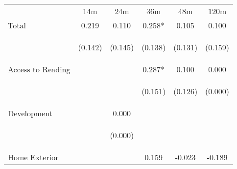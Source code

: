 \begin{tabular}{lccccc}
\hline \noalign{\smallskip} & 14m & 24m & 36m & 48m & 120m\\
\noalign{\smallskip}\hline \noalign{\smallskip}Total & 0.219 & 0.110 & 0.258* & 0.105 & 0.100\\
 & \begin{footnotesize}(0.142)\end{footnotesize} & \begin{footnotesize}(0.145)\end{footnotesize} & \begin{footnotesize}(0.138)\end{footnotesize} & \begin{footnotesize}(0.131)\end{footnotesize} & \begin{footnotesize}(0.159)\end{footnotesize}\\
\noalign{\smallskip}Access to Reading &  &  & 0.287* & 0.100 & 0.000\\
 & \begin{footnotesize}\end{footnotesize} & \begin{footnotesize}\end{footnotesize} & \begin{footnotesize}(0.151)\end{footnotesize} & \begin{footnotesize}(0.126)\end{footnotesize} & \begin{footnotesize}(0.000)\end{footnotesize}\\
\noalign{\smallskip}Development &  & 0.000 &  &  & \\
 & \begin{footnotesize}\end{footnotesize} & \begin{footnotesize}(0.000)\end{footnotesize} & \begin{footnotesize}\end{footnotesize} & \begin{footnotesize}\end{footnotesize} & \begin{footnotesize}\end{footnotesize}\\
\noalign{\smallskip}Home Exterior &  &  & 0.159 & -0.023 & -0.189\\

\end{tabular}
